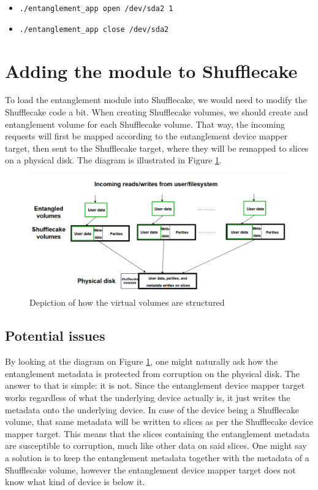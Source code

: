 \documentclass[a4paper,11pt,oneside]{report}
\begin{document}
\begin{itemize}
    \item \texttt{./entanglement\_app open /dev/sda2 1}
    \item \texttt{./entanglement\_app close /dev/sda2}
\end{itemize}



\section{Adding the module to Shufflecake}
To load the entanglement module into Shufflecake, we would need to modify the Shufflecake code a bit. When creating Shufflecake volumes, we should create and entanglement volume for each Shufflecake volume. That way, the incoming requests will first be mapped according to the entanglement device mapper target, then sent to the Shufflecake target, where they will be remapped to slices on a physical disk. The diagram is illustrated in Figure \ref{fig:volumes-diagram}. 

\begin{figure}[!ht]
    \centering
    \includegraphics[scale=0.5]{figures/Volumes_diagram.PNG}
    \caption{Depiction of how the virtual volumes are structured}
    \label{fig:volumes-diagram}
\end{figure}

\subsection{Potential issues}
By looking at the diagram on Figure \ref{fig:volumes-diagram}, one might naturally ask how the entanglement metadata is protected from corruption on the physical disk. The answer to that is simple: it is not. Since the entanglement device mapper target works regardless of what the underlying device actually is, it just writes the metadata onto the underlying device. In case of the device being a Shufflecake volume, that same metadata will be written to slices as per the Shufflecake device mapper target. This means that the slices containing the entanglement metadata are susceptible to corruption, much like other data on said slices. One might say a solution is to keep the entanglement metadata together with the metadata of a Shufflecake volume, however the entanglement device mapper target does not know what kind of device is below it. 
\end{document}
